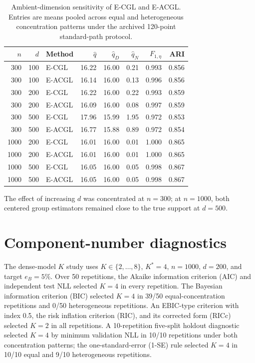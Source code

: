 \documentclass[preprint,12pt,authoryear]{elsarticle}
\begin{document}
\begin{table}[H]
\centering
\footnotesize
\setlength{\tabcolsep}{3pt}
\caption{Ambient-dimension sensitivity of E-CGL and E-ACGL. Entries are means
pooled across equal and heterogeneous concentration patterns under the
archived 120-point standard-path protocol.}
\label{tab:s-ambient-dimension}
\begin{tabular}{rrlrrrrr}
\toprule
$n$ & $d$ & Method & $\widehat q$ & $\widehat q_D$ & $\widehat q_N$ & $F_{1,\eta}$ & ARI \\
\midrule
300 & 100 & E-CGL & 16.22 & 16.00 & 0.21 & 0.993 & 0.856 \\
300 & 100 & E-ACGL & 16.14 & 16.00 & 0.13 & 0.996 & 0.856 \\
300 & 200 & E-CGL & 16.22 & 16.00 & 0.22 & 0.993 & 0.859 \\
300 & 200 & E-ACGL & 16.09 & 16.00 & 0.08 & 0.997 & 0.859 \\
300 & 500 & E-CGL & 17.96 & 15.99 & 1.95 & 0.972 & 0.853 \\
300 & 500 & E-ACGL & 16.77 & 15.88 & 0.89 & 0.972 & 0.854 \\
1000 & 200 & E-CGL & 16.01 & 16.00 & 0.01 & 1.000 & 0.865 \\
1000 & 200 & E-ACGL & 16.01 & 16.00 & 0.01 & 1.000 & 0.865 \\
1000 & 500 & E-CGL & 16.05 & 16.00 & 0.05 & 0.998 & 0.867 \\
1000 & 500 & E-ACGL & 16.05 & 16.00 & 0.05 & 0.998 & 0.867 \\
\bottomrule
\end{tabular}
\end{table}

The effect of increasing $d$ was concentrated at $n=300$; at $n=1000$, both
centered group estimators remained close to the true support at $d=500$.

\section{Component-number diagnostics}
\label{sec:s-component-number}

The dense-model $K$ study uses $K\in\{2,\ldots,8\}$, $K^\ast=4$, $n=1000$,
$d=200$, and target $e_B=5\%$. Over 50 repetitions, the Akaike information
criterion (AIC) \citep{akaike1974aic} and independent test NLL selected $K=4$
in every repetition. The Bayesian information criterion (BIC)
\citep{schwarz1978bic} selected $K=4$ in 39/50 equal-concentration repetitions
and 0/50 heterogeneous repetitions. An EBIC-type criterion with index 0.5,
the risk inflation criterion (RIC), and its corrected form (RICc) selected
$K=2$ in all repetitions. A 10-repetition five-split
holdout diagnostic selected $K=4$ by minimum validation NLL in 10/10
repetitions under both concentration patterns; the one-standard-error (1-SE)
rule selected $K=4$
in 10/10 equal and 9/10 heterogeneous repetitions.
\end{document}
